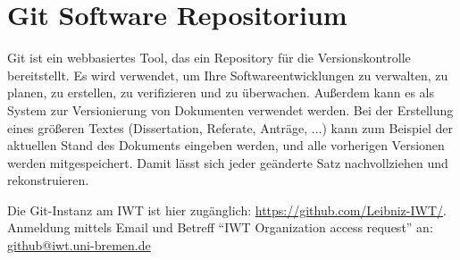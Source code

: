 \section{Git Software Repositorium}

Git ist ein webbasiertes Tool, das ein Repository für die Versionskontrolle
bereitstellt. Es wird verwendet, um Ihre Softwareentwicklungen zu verwalten, zu
planen, zu erstellen, zu verifizieren und zu überwachen. Außerdem kann es als
System zur Versionierung von Dokumenten verwendet werden. Bei der Erstellung
eines größeren Textes (Dissertation, Referate, Anträge, ...) kann zum
Beispiel der aktuellen Stand des Dokuments eingeben werden, und alle vorherigen
Versionen werden mitgespeichert. Damit lässt sich jeder geänderte Satz
nachvollziehen und rekonstruieren.

Die Git-Instanz am IWT ist hier zugänglich: \url{https://github.com/Leibniz-IWT/}.
Anmeldung mittels Email und Betreff “IWT Organization access request” an:
\href{mailto:github@iwt.uni-bremen.de}%
{github@iwt.uni-bremen.de}
